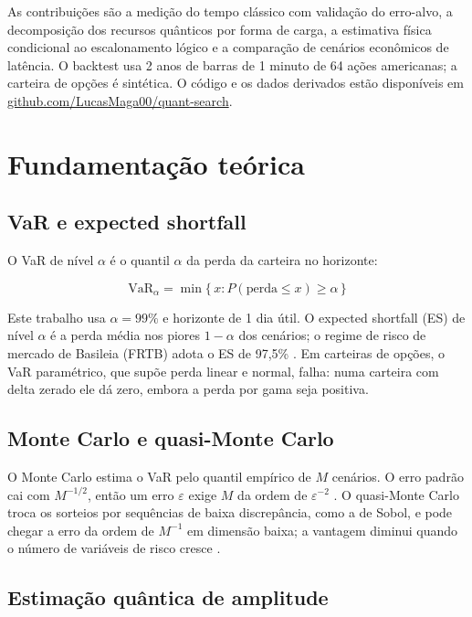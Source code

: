 \documentclass[conference,a4paper]{IEEEtran}
\begin{document}
As contribuições são a medição do tempo clássico com validação do erro-alvo, a decomposição dos recursos quânticos por forma de carga, a estimativa física condicional ao escalonamento lógico e a comparação de cenários econômicos de latência. O backtest usa 2 anos de barras de 1 minuto de 64 ações americanas; a carteira de opções é sintética. O código e os dados derivados estão disponíveis em \href{https://github.com/LucasMaga00/quant-search}{github.com/LucasMaga00/quant-search}.

\section{Fundamentação teórica}\label{fundamentauxe7uxe3o-teuxf3rica}

\subsection{VaR e expected shortfall}\label{var-e-expected-shortfall}

O VaR de nível \(\alpha\) é o quantil \(\alpha\) da perda da carteira no horizonte:

\[\mathrm{VaR}_{\alpha} = \min \{\, x : P(\text{perda} \le x) \ge \alpha \,\} \tag{1}\]

Este trabalho usa \(\alpha = 99\%\) e horizonte de 1 dia útil. O expected shortfall (ES) de nível \(\alpha\) é a perda média nos piores \(1 - \alpha\) dos cenários; o regime de risco de mercado de Basileia (FRTB) adota o ES de 97,5\% \cite{bcbs2019frtb}. Em carteiras de opções, o VaR paramétrico, que supõe perda linear e normal, falha: numa carteira com delta zerado ele dá zero, embora a perda por gama seja positiva.

\subsection{Monte Carlo e quasi-Monte Carlo}\label{monte-carlo-e-quasi-monte-carlo}

O Monte Carlo estima o VaR pelo quantil empírico de \(M\) cenários. O erro padrão cai com \(M^{-1/2}\), então um erro \(\varepsilon\) exige \(M\) da ordem de \(\varepsilon^{-2}\) \cite{glasserman2003montecarlo}. O quasi-Monte Carlo troca os sorteios por sequências de baixa discrepância, como a de Sobol, e pode chegar a erro da ordem de \(M^{-1}\) em dimensão baixa; a vantagem diminui quando o número de variáveis de risco cresce \cite{glasserman2003montecarlo}.

\subsection{Estimação quântica de amplitude}\label{estimauxe7uxe3o-quuxe2ntica-de-amplitude}
\end{document}
